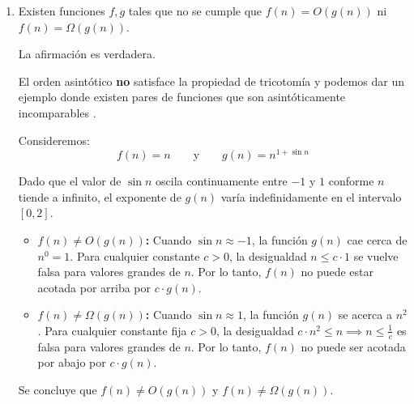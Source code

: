 \begin{enumerate}[label=\arabic*.]
    \item Existen funciones $f, g$ tales que no se cumple que $f(n)=O(g(n))$ ni $f(n)=\Omega(g(n))$.

    La afirmación es verdadera.
        
    El orden asintótico \textbf{no} satisface la propiedad de tricotomía y podemos dar un ejemplo donde existen pares de funciones que son asintóticamente incomparables \cite{clrs2022}.
        
    Consideremos:
    \[
    f(n) = n \qquad \text{y} \qquad g(n) = n^{1 + \sin n}
    \]
        
    Dado que el valor de $\sin n$ oscila continuamente entre $-1$ y $1$ conforme $n$ tiende a infinito, el exponente de $g(n)$ varía indefinidamente en el intervalo $[0, 2]$.
        
    \begin{itemize}
        \item \textbf{$f(n) \neq O(g(n))$:}  
        Cuando $\sin n \approx -1$, la función $g(n)$ cae cerca de $n^0 = 1$. Para cualquier constante $c > 0$, la desigualdad $n \le c \cdot 1$ se vuelve falsa para valores grandes de $n$. Por lo tanto, $f(n)$ no puede estar acotada por arriba por $c \cdot g(n)$.
    
        \item \textbf{$f(n) \neq \Omega(g(n))$:}  
        Cuando $\sin n \approx 1$, la función $g(n)$ se acerca a $n^2$. Para cualquier constante fija $c > 0$, la desigualdad $c \cdot n^2 \le n \implies n \le \frac{1}{c}$ es falsa para valores grandes de $n$. Por lo tanto, $f(n)$ no puede ser acotada por abajo por $c \cdot g(n)$.
    \end{itemize}
        
    Se concluye que $f(n) \neq O(g(n))$ y $f(n) \neq \Omega(g(n))$.

\end{enumerate}
